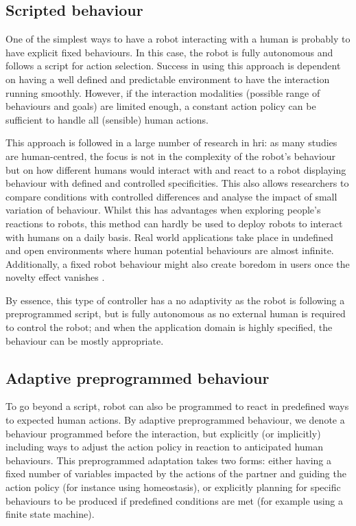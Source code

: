 \subsection{Scripted behaviour}

    One of the simplest ways to have a robot interacting with a human is probably to have explicit fixed behaviours. In this case, the robot is fully autonomous and follows a script for action selection. Success in using this approach is dependent on having a well defined and predictable environment to have the interaction running smoothly. However, if the interaction modalities (possible range of behaviours and goals) are limited enough, a constant action policy can be sufficient to handle all (sensible) human actions. 
    
    This approach is followed in a large number of research in \gls{hri}: as many studies are human-centred, the focus is not in the complexity of the robot's behaviour but on how different humans would interact with and react to a robot displaying behaviour with defined and controlled specificities. This also allows researchers to compare conditions with controlled differences and analyse the impact of small variation of behaviour. Whilst this has advantages when exploring people's reactions to robots, this method can hardly be used to deploy robots to interact with humans on a daily basis. Real world applications take place in undefined and open environments where human potential behaviours are almost infinite. Additionally, a fixed robot behaviour might also create boredom in users once the novelty effect vanishes \citep{salter2004robots}.
  
    By essence, this type of controller has a no adaptivity as the robot is following a preprogrammed script, but is fully autonomous as no external human is required to control the robot; and when the application domain is highly specified, the behaviour can be mostly appropriate.

\subsection{Adaptive preprogrammed behaviour}
	
	To go beyond a script, robot can also be programmed to react in predefined ways to expected human actions. By adaptive preprogrammed behaviour, we denote a behaviour programmed before the interaction, but explicitly (or implicitly) including ways to adjust the action policy in reaction to anticipated human behaviours. This preprogrammed adaptation takes two forms: either having a fixed number of variables impacted by the actions of the partner and guiding the action policy (for instance using homeostasis), or explicitly planning for specific behaviours to be produced if predefined conditions are met (for example using a finite state machine).
	
